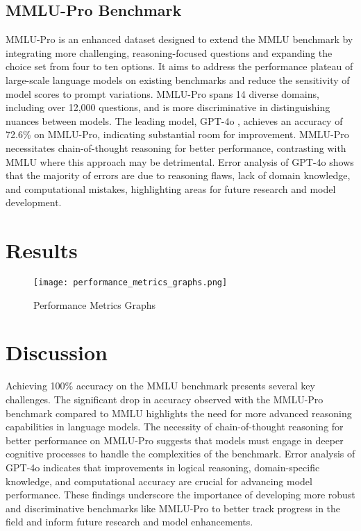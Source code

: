 \documentclass[conference]{IEEEtran}
\begin{document}
\subsection{MMLU-Pro Benchmark}
MMLU-Pro is an enhanced dataset designed to extend the MMLU benchmark by integrating more challenging, reasoning-focused questions and expanding the choice set from four to ten options. It aims to address the performance plateau of large-scale language models on existing benchmarks and reduce the sensitivity of model scores to prompt variations. MMLU-Pro spans 14 diverse domains, including over 12,000 questions, and is more discriminative in distinguishing nuances between models. The leading model, GPT-4o \cite{openai2023gpt4}, achieves an accuracy of 72.6\% on MMLU-Pro, indicating substantial room for improvement. MMLU-Pro necessitates chain-of-thought reasoning for better performance, contrasting with MMLU where this approach may be detrimental. Error analysis of GPT-4o shows that the majority of errors are due to reasoning flaws, lack of domain knowledge, and computational mistakes, highlighting areas for future research and model development.


\section{Results}
\begin{figure}[htbp]
\centerline{\texttt{[image: performance\_metrics\_graphs.png]}}
\caption{Performance Metrics Graphs}
\label{fig}
\end{figure}

\section{Discussion}
Achieving 100\% accuracy on the MMLU benchmark presents several key challenges. The significant drop in accuracy observed with the MMLU-Pro benchmark compared to MMLU highlights the need for more advanced reasoning capabilities in language models. The necessity of chain-of-thought reasoning for better performance on MMLU-Pro suggests that models must engage in deeper cognitive processes to handle the complexities of the benchmark. Error analysis of GPT-4o indicates that improvements in logical reasoning, domain-specific knowledge, and computational accuracy are crucial for advancing model performance. These findings underscore the importance of developing more robust and discriminative benchmarks like MMLU-Pro to better track progress in the field and inform future research and model enhancements.
\end{document}
